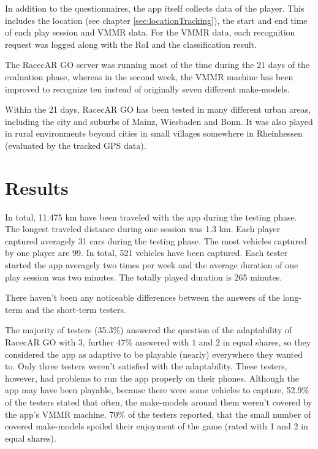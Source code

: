 In addition to the questionnaires, the app itself collects data of the player. This includes the location (see chapter \ref{sec:locationTracking}), the start and end time of each play session and VMMR data. For the VMMR data, each recognition request was logged along with the RoI and the classification result.

The RacecAR GO server was running most of the time during the 21 days of the evaluation phase, whereas in the second week, the VMMR machine has been improved to recognize ten instead of originally seven different make-models.

Within the 21 days, RacecAR GO has been tested in many different urban areas, including the city and suburbs of Mainz, Wiesbaden and Bonn. It was also played in rural environments beyond cities in small villages somewhere in Rheinhessen (evaluated by the tracked GPS data).

\section{Results}
In total, 11.475 km have been traveled with the app during the testing phase. The longest traveled distance during one session was 1.3 km. Each player captured averagely 31 cars during the testing phase. The most vehicles captured by one player are 99. In total, 521 vehicles have been captured. Each tester started the app averagely two times per week and the average duration of one play session was two minutes. The totally played duration is 265 minutes.

There haven't been any noticeable differences between the answers of the long-term and the short-term testers.

The majority of testers (35.3\%) answered the question of the adaptability of RacecAR GO with $3$, further 47\% answered with $1$ and $2$ in equal shares, so they considered the app as adaptive to be playable (nearly) everywhere they wanted to. Only three testers weren't satisfied with the adaptability. These testers, however, had problems to run the app properly on their phones. Although the app may have been playable, because there were some vehicles to capture, 52.9\% of the testers stated that often, the make-models around them weren't covered by the app's VMMR machine. 70\% of the testers reported, that the small number of covered make-models spoiled their enjoyment of the game (rated with 1 and 2 in equal shares).

